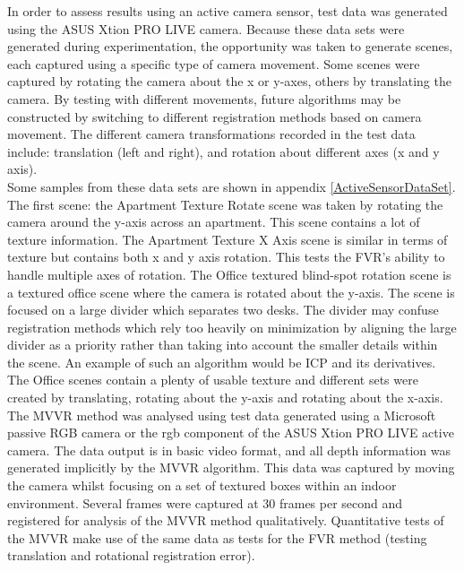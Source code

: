 


In order to assess results using an active camera sensor, test data was generated using the ASUS Xtion PRO LIVE camera. Because these data sets were generated during experimentation, the opportunity was taken to generate scenes, each captured using a specific type of camera movement. Some scenes were captured by rotating the camera about the x or y-axes, others by translating the camera. By testing with different movements, future algorithms may be constructed by switching to different registration methods based on camera movement. The different camera transformations recorded in the test data include: translation (left and right), and rotation about different axes (x and y axis). \\

Some samples from these data sets are shown in appendix \ref{ActiveSensorDataSet}. The first scene: the Apartment Texture Rotate scene was taken by rotating the camera around the y-axis across an apartment. This scene contains a lot of texture information. The Apartment Texture X Axis scene is similar in terms of texture but contains both x and y axis rotation. This tests the FVR's ability to handle multiple axes of rotation. The Office textured blind-spot rotation scene is a textured office scene where the camera is rotated about the y-axis. The scene is focused on a large divider which separates two desks. The divider may confuse registration methods which rely too heavily on minimization by aligning the large divider as a priority rather than taking into account the smaller details within the scene. An example of such an algorithm would be ICP and its derivatives. The Office scenes contain a plenty of usable texture and different sets were created by translating, rotating about the y-axis and rotating about the x-axis. \\

The MVVR method was analysed using test data generated using a Microsoft passive RGB camera or the rgb component of the ASUS Xtion PRO LIVE active camera. The data output is in basic video format, and all depth information was generated implicitly by the MVVR algorithm. This data was captured by moving the camera whilst focusing on a set of textured boxes within an indoor environment. Several frames were captured at 30 frames per second and registered for analysis of the MVVR method qualitatively. Quantitative tests of the MVVR make use of the same data as tests for the FVR method (testing translation and rotational registration error). \\

